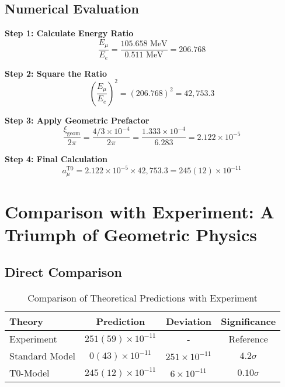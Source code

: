 \documentclass[12pt,a4paper]{report}
\newcommand{\xigeom}{\xi_{\text{geom}}}   %
\newcommand{\Ee}{E_e}                     %
\newcommand{\Emu}{E_\mu}                  %
\begin{document}
	\subsection{Numerical Evaluation}
	\label{subsec:numerical_evaluation}
	
	\textbf{Step 1: Calculate Energy Ratio}
	\begin{equation}
		\frac{\Emu}{\Ee} = \frac{105.658 \text{ MeV}}{0.511 \text{ MeV}} = 206.768
		\label{eq:energy_ratio}
	\end{equation}
	
	\textbf{Step 2: Square the Ratio}
	\begin{equation}
		\left(\frac{\Emu}{\Ee}\right)^2 = (206.768)^2 = 42,753.3
		\label{eq:energy_ratio_squared}
	\end{equation}
	
	\textbf{Step 3: Apply Geometric Prefactor}
	\begin{equation}
		\frac{\xigeom}{2\pi} = \frac{4/3 \times 10^{-4}}{2\pi} = \frac{1.333 \times 10^{-4}}{6.283} = 2.122 \times 10^{-5}
		\label{eq:geometric_prefactor}
	\end{equation}
	
	\textbf{Step 4: Final Calculation}
	\begin{equation}
		a_\mu^{\text{T0}} = 2.122 \times 10^{-5} \times 42,753.3 = 245(12) \times 10^{-11}
		\label{eq:t0_final}
	\end{equation}
	
	\section{Comparison with Experiment: A Triumph of Geometric Physics}
	\label{sec:comparison_experiment}
	
	\subsection{Direct Comparison}
	\label{subsec:direct_comparison}
	
	\begin{table}[H]
		\centering
		\caption{Comparison of Theoretical Predictions with Experiment}
		\begin{tabular}{@{}lccc@{}}
			\toprule
			\textbf{Theory} & \textbf{Prediction} & \textbf{Deviation} & \textbf{Significance} \\
			\midrule
			Experiment & $251(59) \times 10^{-11}$ & - & Reference \\
			Standard Model & $0(43) \times 10^{-11}$ & $251 \times 10^{-11}$ & $4.2\sigma$ \\
			T0-Model & $245(12) \times 10^{-11}$ & $6 \times 10^{-11}$ & $0.10\sigma$ \\
			\bottomrule
		\end{tabular}
	\end{table}
	
\end{document}
